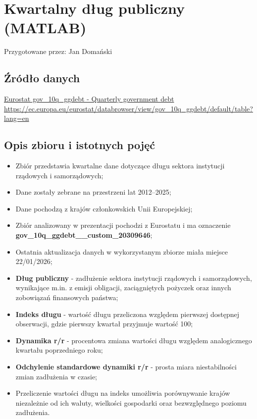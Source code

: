 \documentclass[12pt]{article}
\begin{document}
\newpage
\section{Kwartalny dług publiczny (MATLAB)}

Przygotowane przez: Jan Domański

\subsection{Źródło danych}
\href{https://ec.europa.eu/eurostat/databrowser/view/gov_10q_ggdebt/default/table?lang=en}
{Eurostat gov\_10q\_ggdebt - Quarterly government debt} \\
\url{https://ec.europa.eu/eurostat/databrowser/view/gov_10q_ggdebt/default/table?lang=en}

\subsection{Opis zbioru i istotnych pojęć}
\begin{itemize}
    \item Zbiór przedstawia kwartalne dane dotyczące długu sektora instytucji rządowych i samorządowych;
    \item Dane zostały zebrane na przestrzeni lat 2012--2025;
    \item Dane pochodzą z krajów członkowskich Unii Europejskiej;
    \item Zbiór analizowany w prezentacji pochodzi z Eurostatu i ma oznaczenie \textbf{gov\_10q\_ggdebt\_\_custom\_20309646};
    \item Ostatnia aktualizacja danych w wykorzystanym zbiorze miała miejsce 22/01/2026;
    \item \textbf{Dług publiczny} - zadłużenie sektora instytucji rządowych i samorządowych, wynikające m.in. z emisji obligacji, zaciągniętych pożyczek oraz innych zobowiązań finansowych państwa;
    \item \textbf{Indeks długu} - wartość długu przeliczona względem pierwszej dostępnej obserwacji, gdzie pierwszy kwartał przyjmuje wartość 100;
    \item \textbf{Dynamika r/r} - procentowa zmiana wartości długu względem analogicznego kwartału poprzedniego roku;
    \item \textbf{Odchylenie standardowe dynamiki r/r} - prosta miara niestabilności zmian zadłużenia w czasie;
    \item Przeliczenie wartości długu na indeks umożliwia porównywanie krajów niezależnie od ich waluty, wielkości gospodarki oraz bezwzględnego poziomu zadłużenia.
\end{itemize}
\end{document}
